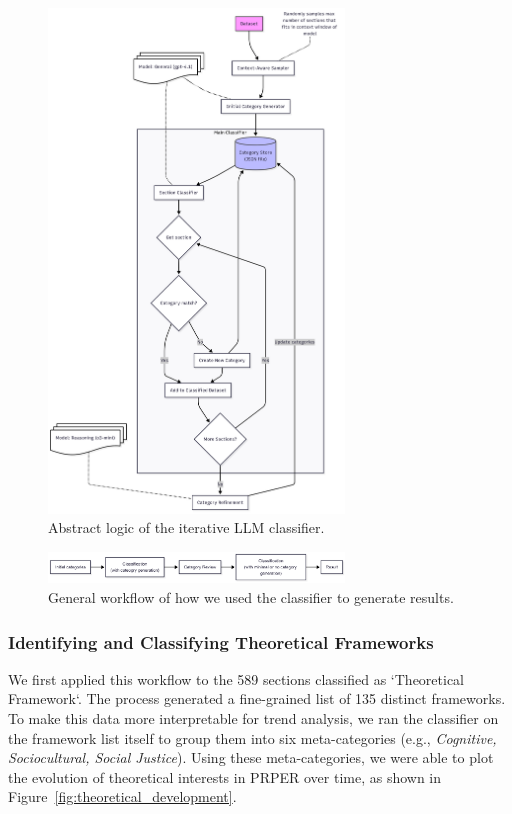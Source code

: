 \begin{figure}
    \centering
    \includegraphics[width=0.7\textwidth]{media/classifier_logic.png}
    \caption{Abstract logic of the iterative LLM classifier.}
    \label{fig:classifier_logic}
\end{figure}

\begin{figure}
    \centering
    \includegraphics[width=0.7\textwidth]{media/general-workflow.png}
    \caption{General workflow of how we used the classifier to generate results.}
    \label{fig:classifier_workflow}
\end{figure}

\subsubsection{Identifying and Classifying Theoretical Frameworks}

We first applied this workflow to the 589 sections classified as `Theoretical
Framework`. The process generated a fine-grained list of 135 distinct
frameworks. To make this data more interpretable for trend analysis, we ran the
classifier on the framework list itself to group them into six meta-categories
(e.g., \emph{Cognitive, Sociocultural, Social Justice}). Using these
meta-categories, we were able to plot the evolution of theoretical interests in
PRPER over time, as shown in Figure~\ref{fig:theoretical_development}.

